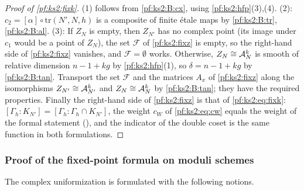 \begin{proof}[Proof of \cref{pf:ks2:fixk}]
(1) follows from \ref{pf:ks2:B:cx}, using \cref{pf:ks2:hfp}(3),(4). (2): $c_2=[\alpha]\circ
\mathrm{tr}(N',N,h)$ is a composite of finite \'etale maps by \ref{pf:ks2:B:tr},\ref{pf:ks2:B:al}. (3): If
$Z_N$ is empty, then $Z_{N'}$ has no complex point (its image under $c_1$ would be a point of $Z_N$), the
set $\mathcal F$ of \cref{pf:ks2:fixz} is empty, so the right-hand side of \cref{pf:ks2:fixz} vanishes,
and $\mathcal F=\emptyset$ works. Otherwise, $Z_N\cong\mathcal{A}_N^k$ is smooth of relative dimension
$n-1+kg$ by \cref{pf:ks2:hfp}(1), so $\delta=n-1+kg$ by \ref{pf:ks2:B:tan}. Transport the set $\mathcal F$
and the matrices $A_x$ of \cref{pf:ks2:fixz} along the isomorphisms $Z_{N'}\cong\mathcal{A}_{N'}^k$ and
$Z_N\cong\mathcal{A}_N^k$ by \ref{pf:ks2:B:tan}; they have the required properties. Finally the right-hand side
of \cref{pf:ks2:fixz} is that of \eqref{pf:ks2:eq:fixk}: $[\Gamma_h:K_{N'}]=[\Gamma_h:\Gamma_h\cap
K_{N'}]$, the weight $c_W$ of \eqref{pf:ks2:eq:cw} equals the weight of the formal statement
(), and the indicator of the double coset is the same function in
both formulations.
\end{proof}

\subsubsection{Proof of the fixed-point formula on moduli schemes}\label{pf:ks2:sec:fixproof}

The complex uniformization is formulated with the following notions.

